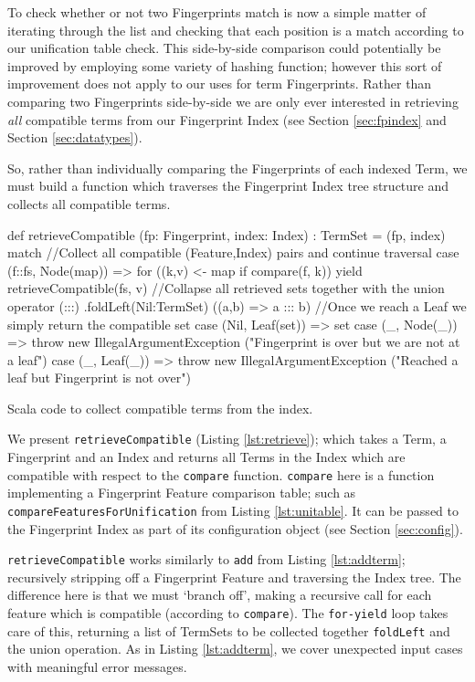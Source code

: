 To check whether or not two Fingerprints match is now a simple matter of iterating
through the list and checking that each position is a match according to our unification
table check. This side-by-side comparison could potentially be improved by employing
some variety of hashing function; however this sort of improvement does not
apply to our uses for term Fingerprints. Rather than comparing two Fingerprints
side-by-side we are only ever interested in retrieving \emph{all} compatible
terms from our Fingerprint Index (see Section \ref{sec:fpindex}
and Section \ref{sec:datatypes}).

So, rather than individually comparing the Fingerprints of each indexed Term,
we must build a function which traverses the Fingerprint Index tree structure
and collects all compatible terms.

\begin{listing}[H]
\begin{scalacode}
def retrieveCompatible (fp: Fingerprint, index: Index) : TermSet =
(fp, index) match {
//Collect all compatible (Feature,Index) pairs and continue traversal
    case (f::fs, Node(map)) => 
        {for ((k,v) <- map if compare(f, k))
            yield retrieveCompatible(fs, v)}
//Collapse all retrieved sets together with the union operator (:::)
        .foldLeft(Nil:TermSet) ((a,b) => a ::: b)
//Once we reach a Leaf we simply return the compatible set 
    case (Nil, Leaf(set)) => set
    case (_, Node(_)) => throw new IllegalArgumentException
         ("Fingerprint is over but we are not at a leaf")
    case (_, Leaf(_)) => throw new IllegalArgumentException
         ("Reached a leaf but Fingerprint is not over")
}
\end{scalacode}
\caption{Scala code to collect compatible terms from the index.}
\label{lst:retrieve}
\end{listing}

We present \verb!retrieveCompatible! (Listing \ref{lst:retrieve}); which takes
a Term, a Fingerprint and an Index and returns all Terms in the Index which
are compatible with respect to the \verb!compare! function.
\verb!compare! here is a function implementing a Fingerprint Feature comparison
table; such as \verb!compareFeaturesForUnification! from Listing \ref{lst:unitable}.
It can be passed to the Fingerprint Index as part of its configuration
object (see Section \ref{sec:config}).

\verb!retrieveCompatible! works similarly to \verb!add! from Listing \ref{lst:addterm};
recursively stripping off a Fingerprint Feature and traversing the Index tree.
The difference here is that we must `branch off', making a recursive call for
each feature which is compatible (according to \verb!compare!). The \verb!for-yield!
loop takes care of this, returning a list of TermSets to be collected together
\verb!foldLeft! and the union operation. As in Listing \ref{lst:addterm}, we cover
unexpected input cases with meaningful error messages.


